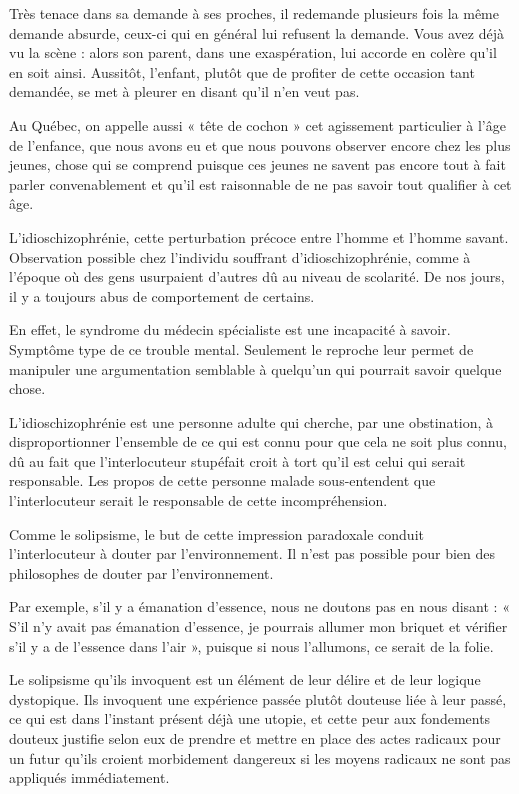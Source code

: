 \documentclass[12pt,oneside]{article}
\begin{document}
Très tenace dans sa demande à ses proches, il redemande plusieurs fois la même demande absurde, ceux-ci qui en général lui refusent la demande. Vous avez déjà vu la scène : alors son parent, dans une exaspération, lui accorde en colère qu'il en soit ainsi. Aussitôt, l'enfant, plutôt que de profiter de cette occasion tant demandée, se met à pleurer en disant qu'il n'en veut pas.

Au Québec, on appelle aussi « tête de cochon » cet agissement particulier à l'âge de l'enfance, que nous avons eu et que nous pouvons observer encore chez les plus jeunes, chose qui se comprend puisque ces jeunes ne savent pas encore tout à fait parler convenablement et qu'il est raisonnable de ne pas savoir tout qualifier à cet âge.

L'idioschizophrénie, cette perturbation précoce entre l'homme et l'homme savant. Observation possible chez l'individu souffrant d'idioschizophrénie, comme à l'époque où des gens usurpaient d'autres dû au niveau de scolarité. De nos jours, il y a toujours abus de comportement de certains.

En effet, le syndrome du médecin spécialiste est une incapacité à savoir. Symptôme type de ce trouble mental. Seulement le reproche leur permet de manipuler une argumentation semblable à quelqu'un qui pourrait savoir quelque chose.

L'idioschizophrénie est une personne adulte qui cherche, par une obstination, à disproportionner l'ensemble de ce qui est connu pour que cela ne soit plus connu, dû au fait que l'interlocuteur stupéfait croit à tort qu'il est celui qui serait responsable. Les propos de cette personne malade sous-entendent que l'interlocuteur serait le responsable de cette incompréhension.

Comme le solipsisme, le but de cette impression paradoxale conduit l'interlocuteur à douter par l'environnement. Il n'est pas possible pour bien des philosophes de douter par l'environnement.

Par exemple, s'il y a émanation d'essence, nous ne doutons pas en nous disant : « S'il n'y avait pas émanation d'essence, je pourrais allumer mon briquet et vérifier s'il y a de l'essence dans l'air », puisque si nous l'allumons, ce serait de la folie.

Le solipsisme qu'ils invoquent est un élément de leur délire et de leur logique dystopique. Ils invoquent une expérience passée plutôt douteuse liée à leur passé, ce qui est dans l'instant présent déjà une utopie, et cette peur aux fondements douteux justifie selon eux de prendre et mettre en place des actes radicaux pour un futur qu'ils croient morbidement dangereux si les moyens radicaux ne sont pas appliqués immédiatement.
\end{document}
